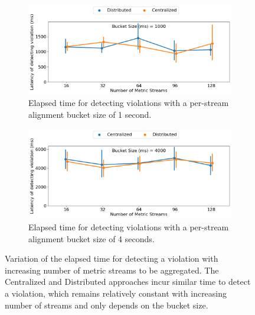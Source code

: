 \begin{figure}
\centering
\begin{subfigure}{0.48\textwidth}
  \centering
  \includegraphics[width=\linewidth]{figures/design_space/monitoring/response_time_B_1000.png}
  \caption{Elapsed time for detecting violations with a per-stream alignment bucket size of 1 second.}
  \label{fig:response_time_b_1000}
\end{subfigure}
\begin{subfigure}{0.48\textwidth}
  \centering
  \includegraphics[width=\linewidth]{figures/design_space/monitoring/response_time_B_4000.png}
  \caption{Elapsed time for detecting violations with a per-stream alignment bucket size of 4 seconds.}
  \label{fig:response_time_b_4000}
\end{subfigure}
\caption{Variation of the elapsed time for detecting a violation with increasing number of metric streams to be aggregated. The Centralized and Distributed approaches incur similar time to detect a violation, which remains relatively constant with increasing number of streams and only depends on the bucket size.}
\label{fig:monitoring_response_time}
\end{figure}


